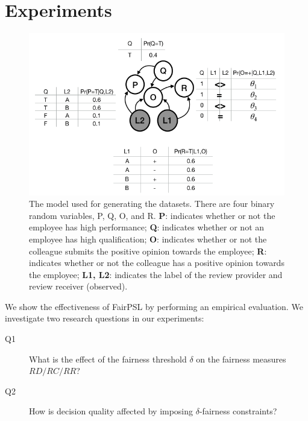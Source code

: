 \documentclass[11pt]{article}
\begin{document}
\section{Experiments}
\label{sec:experiment}

\begin{figure}
  \begin{minipage}[c]{0.6\textwidth}
    \includegraphics[width=\textwidth]{figs/BN.png}
  \end{minipage}\hfill
  \begin{minipage}[c]{0.45\textwidth}
    \caption{
        \small The model used for generating the datasets. There are four binary random variables, P, Q, O, and R. \textbf{P}: indicates whether or not the employee has high performance; \textbf{Q}: indicates whether or not an employee has high qualification; \textbf{O}: indicates whether or not the colleague submits the positive opinion towards the employee;  \textbf{R}: indicates whether or not the colleague has a positive opinion towards the employee;  \textbf{L1, L2}: indicates the label of the review provider and review receiver (observed).
    } \label{fig:BN}
  \end{minipage}
\end{figure}

We show the effectiveness of FairPSL by performing an empirical evaluation. We investigate two research questions in our experiments:
\begin{description}
\item[Q1] What is the effect of the fairness threshold $\delta$ on the fairness measures $RD/RC/RR$?
\item[Q2] How is decision quality affected by imposing $\delta$-fairness constraints?
\end{description}
\end{document}
